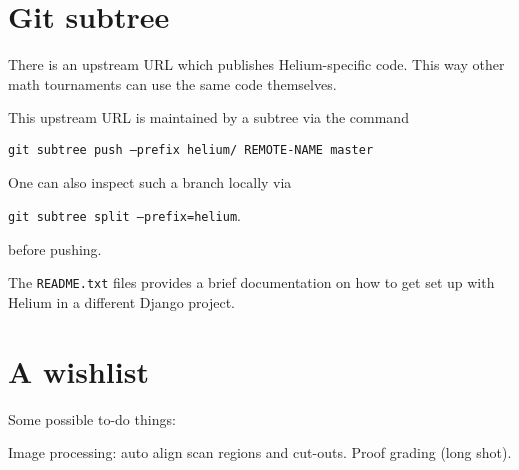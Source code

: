 \section{Git subtree}
There is an upstream URL which publishes Helium-specific code.
This way other math tournaments can use the same code themselves.

This upstream URL is maintained by a subtree via the command
\begin{center}
	\texttt{git subtree push --prefix helium/ REMOTE-NAME master}
\end{center}
One can also inspect such a branch locally via
\begin{center}
	\texttt{git subtree split --prefix=helium}.
\end{center}
before pushing.

The \texttt{README.txt} files provides a brief documentation
on how to get set up with Helium in a different Django project.

\section{A wishlist}
Some possible to-do things:
\begin{itemize}
	\ii Image processing: auto align scan regions and cut-outs.
	\ii Proof grading (long shot).
\end{itemize}
